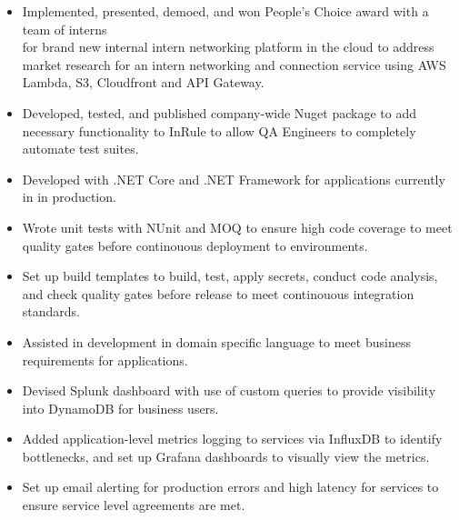 \documentclass[overlapped]{res}
\begin{document}
\begin{resume}
\begin{itemize}
                  \item Implemented, presented, demoed, and won People's Choice
                   award with a team of interns \\for brand new internal intern
                   networking platform in the cloud to
                   address market research for an intern
                   networking and connection service using
                   AWS Lambda, S3, Cloudfront and API Gateway.

                  \item Developed, tested, and published
                  company-wide Nuget package to add
                  necessary functionality to InRule
                  to allow QA Engineers to completely automate test suites.

                  \item Developed with .NET Core and .NET Framework
                  for applications currently in in production.

                  \item Wrote unit tests with NUnit and MOQ to ensure high code coverage
                  to meet quality gates before continouous deployment
                   to environments.

                  \item Set up build templates to build,
                  test, apply secrets, conduct code analysis,
                  and check quality gates before release to meet
                  continouous integration standards.

                  \item Assisted in development in domain
                  specific language to meet business requirements for applications.

                  \item Devised Splunk dashboard with use of
                  custom queries to provide
                   visibility into DynamoDB for business users.

                  \item Added application-level
                  metrics logging to services via InfluxDB to identify bottlenecks,
                  and set up Grafana dashboards to visually view the metrics.

                  \item Set up email alerting for production errors and high latency
                  for services to ensure service level agreements are met.


\end{itemize}
\end{resume}
\end{document}
